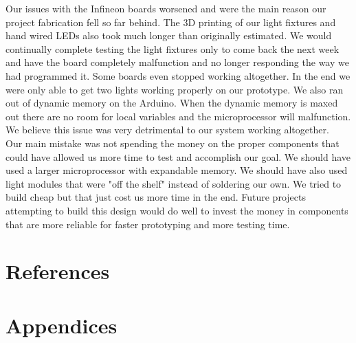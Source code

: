 \documentclass[12pt,a4paper]{report}
\begin{document}
Our issues with the Infineon boards worsened and were the main reason our project fabrication fell so far behind. The 3D printing of our light fixtures and hand wired LEDs also took much longer than originally estimated. We would continually complete testing the light fixtures only to come back the next week and have the board completely malfunction and no longer responding the way we had programmed it. Some boards even stopped working altogether. In the end we were only able to get two lights working properly on our prototype. We also ran out of dynamic memory on the Arduino. When the dynamic memory is maxed out there are no room for local variables and the microprocessor will malfunction. We believe this issue was very detrimental to our system working altogether.\\
Our main mistake was not spending the money on the proper components that could have allowed us more time to test and accomplish our goal. We should have used a larger microprocessor with expandable memory. We should have also used light modules that were "off the shelf" instead of soldering our own. We tried to build cheap but that just cost us more time in the end. Future projects attempting to build this design would do well to invest the money in components that are more reliable for faster prototyping and more testing time.

 
\section{References}
\begingroup
   \def\chapter*#1{}
   
	
\endgroup	

 

\section{Appendices}
\end{document}

